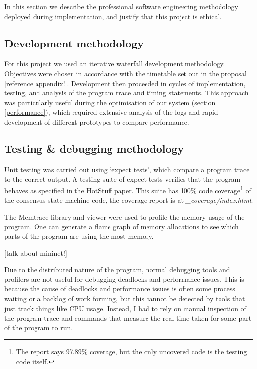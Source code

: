 In this section we describe the professional software engineering methodology deployed during implementation, and justify that this project is ethical.

\subsection{Development methodology} \label{devmethods}

For this project we used an iterative waterfall development methodology. Objectives were chosen in accordance with the timetable set out in the proposal [reference appendix!]. Development then proceeded in cycles of implementation, testing, and analysis of the program trace and timing statements. This approach was particularly useful during the optimisation of our system (section \ref{performance}), which required extensive analysis of the logs and rapid development of different prototypes to compare performance.

\subsection{Testing \& debugging methodology} \label{testing}

Unit testing was carried out using `expect tests', which compare a program trace to the correct output. A testing suite of expect tests verifies that the program behaves as specified in the HotStuff paper. This suite has 100\% code coverage\footnote{The report says 97.89\% coverage, but the only uncovered code is the testing code itself.} of the consensus state machine code, the coverage report is at \textit{\_coverage/index.html}.

The Memtrace library and viewer \cite{noauthor_memtrace_nodate} were used to profile the memory usage of the program. One can generate a flame graph of memory allocations to see which parts of the program are using the most memory.

[talk about mininet!] \cite{noauthor_mininet_nodate}

Due to the distributed nature of the program, normal debugging tools and profilers are not useful for debugging deadlocks and performance issues. This is because the cause of deadlocks and performance issues is often some process waiting or a backlog of work forming, but this cannot be detected by tools that just track things like CPU usage. Instead, I had to rely on manual inspection of the program trace and commands that measure the real time taken for some part of the program to run.

